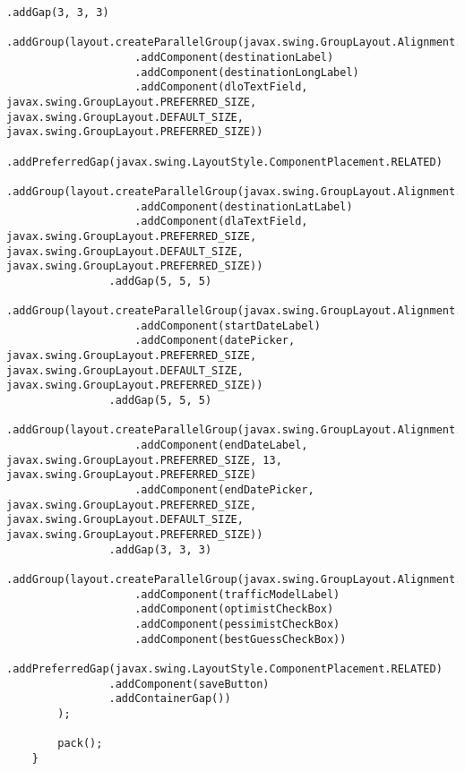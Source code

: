\begin{lstlisting}[caption= main.java]
                .addGap(3, 3, 3)
                .addGroup(layout.createParallelGroup(javax.swing.GroupLayout.Alignment.BASELINE)
                    .addComponent(destinationLabel)
                    .addComponent(destinationLongLabel)
                    .addComponent(dloTextField, javax.swing.GroupLayout.PREFERRED_SIZE, javax.swing.GroupLayout.DEFAULT_SIZE, javax.swing.GroupLayout.PREFERRED_SIZE))
                .addPreferredGap(javax.swing.LayoutStyle.ComponentPlacement.RELATED)
                .addGroup(layout.createParallelGroup(javax.swing.GroupLayout.Alignment.BASELINE)
                    .addComponent(destinationLatLabel)
                    .addComponent(dlaTextField, javax.swing.GroupLayout.PREFERRED_SIZE, javax.swing.GroupLayout.DEFAULT_SIZE, javax.swing.GroupLayout.PREFERRED_SIZE))
                .addGap(5, 5, 5)
                .addGroup(layout.createParallelGroup(javax.swing.GroupLayout.Alignment.BASELINE)
                    .addComponent(startDateLabel)
                    .addComponent(datePicker, javax.swing.GroupLayout.PREFERRED_SIZE, javax.swing.GroupLayout.DEFAULT_SIZE, javax.swing.GroupLayout.PREFERRED_SIZE))
                .addGap(5, 5, 5)
                .addGroup(layout.createParallelGroup(javax.swing.GroupLayout.Alignment.BASELINE)
                    .addComponent(endDateLabel, javax.swing.GroupLayout.PREFERRED_SIZE, 13, javax.swing.GroupLayout.PREFERRED_SIZE)
                    .addComponent(endDatePicker, javax.swing.GroupLayout.PREFERRED_SIZE, javax.swing.GroupLayout.DEFAULT_SIZE, javax.swing.GroupLayout.PREFERRED_SIZE))
                .addGap(3, 3, 3)
                .addGroup(layout.createParallelGroup(javax.swing.GroupLayout.Alignment.BASELINE)
                    .addComponent(trafficModelLabel)
                    .addComponent(optimistCheckBox)
                    .addComponent(pessimistCheckBox)
                    .addComponent(bestGuessCheckBox))
                .addPreferredGap(javax.swing.LayoutStyle.ComponentPlacement.RELATED)
                .addComponent(saveButton)
                .addContainerGap())
        );

        pack();
    }                       


\end{lstlisting}
